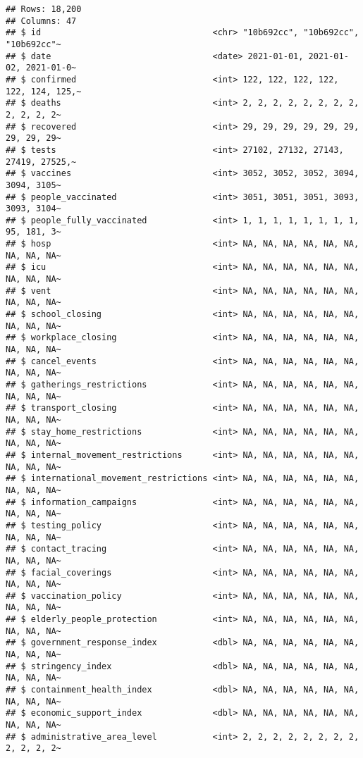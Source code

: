 \documentclass[
]{book}
\begin{document}
\begin{verbatim}
## Rows: 18,200
## Columns: 47
## $ id                                  <chr> "10b692cc", "10b692cc", "10b692cc"~
## $ date                                <date> 2021-01-01, 2021-01-02, 2021-01-0~
## $ confirmed                           <int> 122, 122, 122, 122, 122, 124, 125,~
## $ deaths                              <int> 2, 2, 2, 2, 2, 2, 2, 2, 2, 2, 2, 2~
## $ recovered                           <int> 29, 29, 29, 29, 29, 29, 29, 29, 29~
## $ tests                               <int> 27102, 27132, 27143, 27419, 27525,~
## $ vaccines                            <int> 3052, 3052, 3052, 3094, 3094, 3105~
## $ people_vaccinated                   <int> 3051, 3051, 3051, 3093, 3093, 3104~
## $ people_fully_vaccinated             <int> 1, 1, 1, 1, 1, 1, 1, 1, 95, 181, 3~
## $ hosp                                <int> NA, NA, NA, NA, NA, NA, NA, NA, NA~
## $ icu                                 <int> NA, NA, NA, NA, NA, NA, NA, NA, NA~
## $ vent                                <int> NA, NA, NA, NA, NA, NA, NA, NA, NA~
## $ school_closing                      <int> NA, NA, NA, NA, NA, NA, NA, NA, NA~
## $ workplace_closing                   <int> NA, NA, NA, NA, NA, NA, NA, NA, NA~
## $ cancel_events                       <int> NA, NA, NA, NA, NA, NA, NA, NA, NA~
## $ gatherings_restrictions             <int> NA, NA, NA, NA, NA, NA, NA, NA, NA~
## $ transport_closing                   <int> NA, NA, NA, NA, NA, NA, NA, NA, NA~
## $ stay_home_restrictions              <int> NA, NA, NA, NA, NA, NA, NA, NA, NA~
## $ internal_movement_restrictions      <int> NA, NA, NA, NA, NA, NA, NA, NA, NA~
## $ international_movement_restrictions <int> NA, NA, NA, NA, NA, NA, NA, NA, NA~
## $ information_campaigns               <int> NA, NA, NA, NA, NA, NA, NA, NA, NA~
## $ testing_policy                      <int> NA, NA, NA, NA, NA, NA, NA, NA, NA~
## $ contact_tracing                     <int> NA, NA, NA, NA, NA, NA, NA, NA, NA~
## $ facial_coverings                    <int> NA, NA, NA, NA, NA, NA, NA, NA, NA~
## $ vaccination_policy                  <int> NA, NA, NA, NA, NA, NA, NA, NA, NA~
## $ elderly_people_protection           <int> NA, NA, NA, NA, NA, NA, NA, NA, NA~
## $ government_response_index           <dbl> NA, NA, NA, NA, NA, NA, NA, NA, NA~
## $ stringency_index                    <dbl> NA, NA, NA, NA, NA, NA, NA, NA, NA~
## $ containment_health_index            <dbl> NA, NA, NA, NA, NA, NA, NA, NA, NA~
## $ economic_support_index              <dbl> NA, NA, NA, NA, NA, NA, NA, NA, NA~
## $ administrative_area_level           <int> 2, 2, 2, 2, 2, 2, 2, 2, 2, 2, 2, 2~

\end{verbatim}
\end{document}
